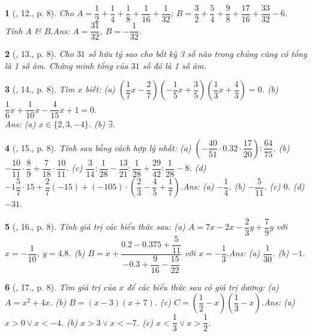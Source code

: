 \documentclass{article}
\newtheorem{baitoan}{}
\begin{document}
\begin{baitoan}[\cite{Tuyen_Toan_7}, 12., p. 8]
	Cho $A = \dfrac{1}{2} + \dfrac{1}{4} + \dfrac{1}{8} + \dfrac{1}{16} + \dfrac{1}{32}$; $B = \dfrac{3}{2} + \dfrac{5}{4} + \dfrac{9}{8} + \dfrac{17}{16} + \dfrac{33}{32} - 6$. Tính $A$ \& $B$.\hfill{\sf Ans: $A = \dfrac{31}{32}$, $B = -\dfrac{1}{32}$.}
\end{baitoan}

\begin{baitoan}[\cite{Tuyen_Toan_7}, 13., p. 8]
	Cho $31$ số hữu tỷ sao cho bất kỳ 3 số nào trong chúng cũng có tổng là 1 số âm. Chứng minh tổng của $31$ số đó là 1 số âm.
\end{baitoan}

\begin{baitoan}[\cite{Tuyen_Toan_7}, 14., p. 8]
	Tìm $x$ biết: (a) $\left(\dfrac{1}{7}x - \dfrac{2}{7}\right)\left(-\dfrac{1}{5}x + \dfrac{3}{5}\right)\left(\dfrac{1}{3}x + \dfrac{4}{3}\right) = 0$. (b) $\dfrac{1}{6}x + \dfrac{1}{10}x - \dfrac{4}{15}x + 1 = 0$.
	\\\mbox{}\hfill{\sf Ans: (a) $x\in\{2,3,-4\}$. (b) $\overline{\exists}$.}
\end{baitoan}

\begin{baitoan}[\cite{Tuyen_Toan_7}, 15., p. 8]
	Tính sau bằng cách hợp lý nhất: (a) $\left(-\dfrac{40}{51}\cdot 0.32\cdot\dfrac{17}{20}\right):\dfrac{64}{75}$. (b) $-\dfrac{10}{11}\cdot\dfrac{8}{9} + \dfrac{7}{18}\cdot\dfrac{10}{11}$. (c) $\dfrac{3}{14}:\dfrac{1}{28} - \dfrac{13}{21}:\dfrac{1}{28} + \dfrac{29}{42}:\dfrac{1}{28} - 8$. (d) $-1\dfrac{5}{7}\cdot 15 + \dfrac{2}{7}(-15) + (-105)\cdot\left(\dfrac{2}{3} - \dfrac{4}{5} + \dfrac{1}{7}\right)$.\hfill{\sf Ans: (a) $-\dfrac{1}{4}$. (b) $-\dfrac{5}{11}$. (c) $0$. (d) $-31$.}
\end{baitoan}

\begin{baitoan}[\cite{Tuyen_Toan_7}, 16., p. 8]
	Tính giá trị các biểu thức sau: (a) $A = 7x - 2x - \dfrac{2}{3}y + \dfrac{7}{9}y$ với $x = -\dfrac{1}{10}$, $y = 4.8$. (b) $B = x + \dfrac{0.2 - 0.375 + \dfrac{5}{11}}{-0.3 + \dfrac{9}{16} - \dfrac{15}{22}}$ với $x = -\dfrac{1}{3}$.\hfill{\sf Ans: (a) $\dfrac{1}{30}$. (b) $-1$.}
\end{baitoan}

\begin{baitoan}[\cite{Tuyen_Toan_7}, 17., p. 8]
	Tìm giá trị của $x$ để các biểu thức sau có giá trị dương: (a) $A = x^2 + 4x$. (b) $B = (x - 3)(x + 7)$. (c) $C = \left(\dfrac{1}{2} - x\right)\left(\dfrac{1}{3} - x\right)$.\hfill{\sf Ans: (a) $x > 0\lor x < -4$. (b) $x > 3\lor x < -7$. (c) $x < \dfrac{1}{3}\lor x > \dfrac{1}{2}$.}
\end{baitoan}
\end{document}
